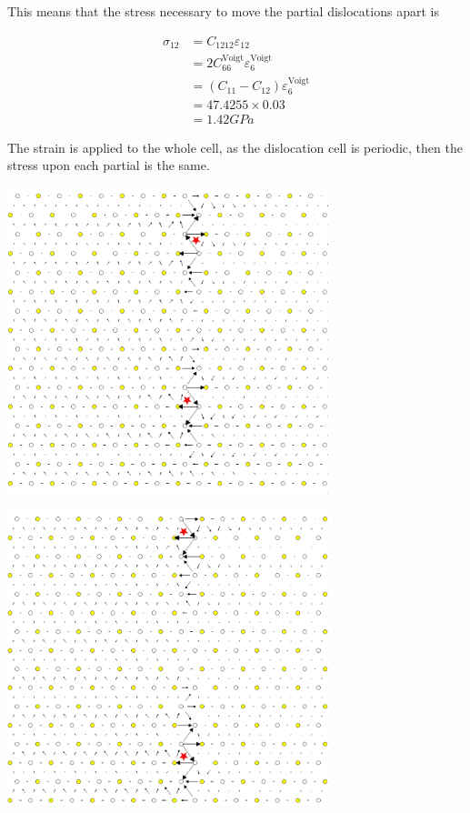 \documentclass[11pt]{article}
\begin{document}
This means that the stress necessary to move the partial
dislocations apart is 

\begin{align*}
\sigma_{12} &= C_{1212}\varepsilon_{12} \\
    &= 2C^{\text{Voigt}}_{66 }\varepsilon_6^{\text{Voigt}} \\
    &= ( C_{11}- C_{12}) \varepsilon_6^{\text{Voigt}} \\
    &= 47.4255 \times 0.03 \\ 
    &= 1.42 GPa\ 
\end{align*}

The strain is applied to the whole cell, as the dislocation cell
is periodic, then the stress upon each partial is the same. 

\begin{center}
\includegraphics[width=0.7\textwidth]{Images/final_model_peierls_xy_0.03_initial_partials.png}
\end{center}
\begin{center}
\includegraphics[width=0.7\textwidth]{Images/final_model_peierls_xy_0.03_final_partials.png}
\end{center}
\end{document}
